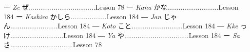 \begin{itemize}
ー \emph{Ze }ぜ\dothyp{}\dothyp{}\dothyp{}\dothyp{}\dothyp{}\dothyp{}\dothyp{}\dothyp{}\dothyp{}\dothyp{}\dothyp{}\dothyp{}\dothyp{}\dothyp{}\dothyp{}\dothyp{}\dothyp{}\dothyp{}\dothyp{}\dothyp{}\dothyp{}\dothyp{}\dothyp{}\dothyp{}\dothyp{}\dothyp{}\dothyp{}\dothyp{}\dothyp{}\dothyp{}\dothyp{}\dothyp{}\dothyp{}..Lesson 78 \hfill\break
ー \emph{Kana }かな\dothyp{}\dothyp{}\dothyp{}\dothyp{}\dothyp{}\dothyp{}\dothyp{}\dothyp{}\dothyp{}\dothyp{}\dothyp{}\dothyp{}\dothyp{}\dothyp{}\dothyp{}\dothyp{}\dothyp{}\dothyp{}\dothyp{}\dothyp{}\dothyp{}\dothyp{}\dothyp{}\dothyp{}\dothyp{}\dothyp{}\dothyp{}Lesson 184 \hfill\break
ー \emph{Kashira }かしら\dothyp{}\dothyp{}\dothyp{}\dothyp{}\dothyp{}\dothyp{}\dothyp{}\dothyp{}\dothyp{}\dothyp{}\dothyp{}\dothyp{}\dothyp{}\dothyp{}\dothyp{}\dothyp{}\dothyp{}\dothyp{}.Lesson 184 \hfill\break
― \emph{Jan }じゃん\dothyp{}\dothyp{}\dothyp{}\dothyp{}\dothyp{}\dothyp{}\dothyp{}\dothyp{}\dothyp{}\dothyp{}\dothyp{}\dothyp{}\dothyp{}\dothyp{}\dothyp{}\dothyp{}\dothyp{}\dothyp{}\dothyp{}\dothyp{}\dothyp{}\dothyp{}\dothyp{}\dothyp{}.Lesson 184 \hfill\break
― \emph{Koto }こと\dothyp{}\dothyp{}\dothyp{}\dothyp{}\dothyp{}\dothyp{}\dothyp{}\dothyp{}\dothyp{}\dothyp{}\dothyp{}\dothyp{}\dothyp{}\dothyp{}\dothyp{}\dothyp{}\dothyp{}\dothyp{}\dothyp{}\dothyp{}\dothyp{}\dothyp{}\dothyp{}\dothyp{}\dothyp{}\dothyp{}\dothyp{}Lesson 184 \hfill\break
― \emph{Kke }っけ\dothyp{}\dothyp{}\dothyp{}\dothyp{}\dothyp{}\dothyp{}\dothyp{}\dothyp{}\dothyp{}\dothyp{}\dothyp{}\dothyp{}\dothyp{}\dothyp{}\dothyp{}\dothyp{}\dothyp{}\dothyp{}\dothyp{}\dothyp{}\dothyp{}\dothyp{}\dothyp{}\dothyp{}\dothyp{}\dothyp{}\dothyp{}.Lesson 184 \hfill\break
― \emph{Ya }や\dothyp{}\dothyp{}\dothyp{}\dothyp{}\dothyp{}\dothyp{}\dothyp{}\dothyp{}\dothyp{}\dothyp{}\dothyp{}\dothyp{}\dothyp{}\dothyp{}\dothyp{}\dothyp{}\dothyp{}\dothyp{}\dothyp{}\dothyp{}\dothyp{}\dothyp{}\dothyp{}\dothyp{}\dothyp{}\dothyp{}\dothyp{}\dothyp{}\dothyp{}\dothyp{}\dothyp{}\dothyp{}\dothyp{}.Lesson 184 \hfill\break
ー \emph{Sa }さ\dothyp{}\dothyp{}\dothyp{}\dothyp{}\dothyp{}\dothyp{}\dothyp{}\dothyp{}\dothyp{}\dothyp{}\dothyp{}\dothyp{}\dothyp{}\dothyp{}\dothyp{}\dothyp{}\dothyp{}\dothyp{}\dothyp{}\dothyp{}\dothyp{}\dothyp{}\dothyp{}\dothyp{}\dothyp{}\dothyp{}\dothyp{}\dothyp{}\dothyp{}\dothyp{}\dothyp{}\dothyp{}\dothyp{}Lesson 78 \hfill\break
\hfill\break


\end{itemize}
